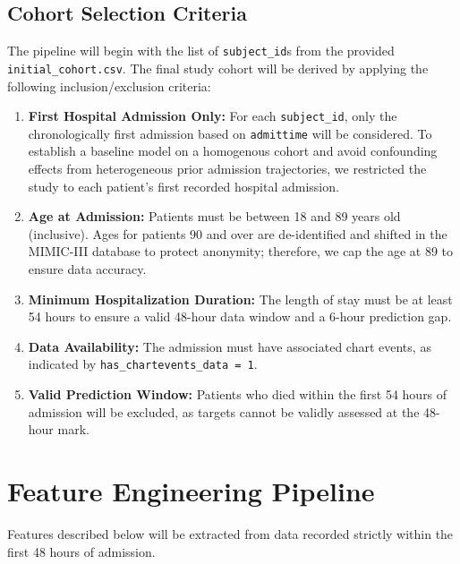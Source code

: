 \documentclass[11pt, a4paper]{article}
\begin{document}
\subsection{Cohort Selection Criteria}
The pipeline will begin with the list of \texttt{subject\_id}s from the provided \texttt{initial\_cohort.csv}. The final study cohort will be derived by applying the following inclusion/exclusion criteria:
\begin{enumerate}
    \item \textbf{First Hospital Admission Only:} For each \texttt{subject\_id}, only the chronologically first admission based on \texttt{admittime} will be considered. To establish a baseline model on a homogenous cohort and avoid confounding effects from heterogeneous prior admission trajectories, we restricted the study to each patient's first recorded hospital admission.
    \item \textbf{Age at Admission:} Patients must be between 18 and 89 years old (inclusive). Ages for patients 90 and over are de-identified and shifted in the MIMIC-III database to protect anonymity; therefore, we cap the age at 89 to ensure data accuracy.
    \item \textbf{Minimum Hospitalization Duration:} The length of stay must be at least 54 hours to ensure a valid 48-hour data window and a 6-hour prediction gap.
    \item \textbf{Data Availability:} The admission must have associated chart events, as indicated by \texttt{has\_chartevents\_data = 1}.
    \item \textbf{Valid Prediction Window:} Patients who died within the first 54 hours of admission will be excluded, as targets cannot be validly assessed at the 48-hour mark.
\end{enumerate}

\section{Feature Engineering Pipeline}
Features described below will be extracted from data recorded strictly within the first 48 hours of admission.
\end{document}
